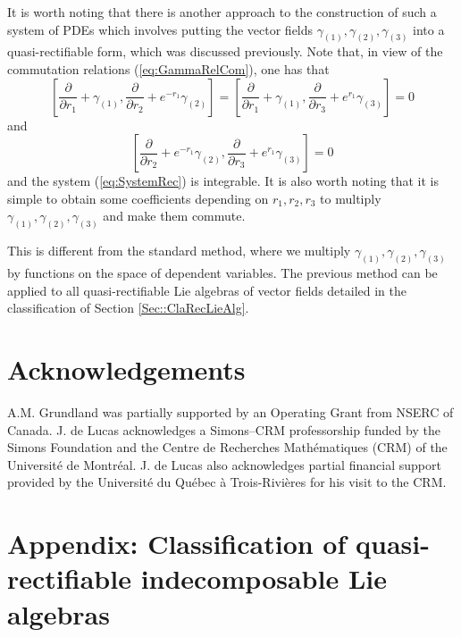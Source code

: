 \documentclass[12pt]{article}
\theoremstyle{plain}
\theoremstyle{definition}
\numberwithin{equation}{section}
\begin{document}
It is worth noting that there is another approach to the  construction of such a system of PDEs which involves putting the vector fields $\gamma_{(1)},\gamma_{(2)},\gamma_{(3)}$ into a quasi-rectifiable form, which was discussed previously. Note that, in view of the commutation relations (\ref{eq:GammaRelCom}), one has that
$$
\left[\frac{\partial}{\partial r_1}+\gamma_{(1)},\frac{\partial}{\partial r_2}+e^{-r_1}\gamma_{(2)}\right]\!=\!\left[\frac{\partial}{\partial r_1}+\gamma_{(1)},\frac{\partial}{\partial r_3}+e^{r_1}\gamma_{(3)}\right]\!=0
$$
and
$$
\!\left[\frac{\partial}{\partial r_2}+e^{-r_1}\gamma_{(2)},\frac{\partial}{\partial r_3}+e^{r_1}\gamma_{(3)}\right]=0
$$
and the system (\ref{eq:SystemRec}) is integrable. It is also worth noting that it is simple to obtain some coefficients depending on $r_1,r_2,r_3$ to multiply $\gamma_{(1)},\gamma_{(2)},\gamma_{(3)}$ and make them commute. 

This is different from the standard method, where we multiply $\gamma_{(1)},\gamma_{(2)},\gamma_{(3)}$ by functions on the space of dependent variables. The previous method can be applied to all quasi-rectifiable Lie algebras of vector fields detailed in the classification of Section \ref{Sec::ClaRecLieAlg}. 


\section*{Acknowledgements}

A.M. Grundland was partially supported by an Operating Grant from NSERC of Canada.  J. de Lucas acknowledges a Simons--CRM professorship funded by the Simons Foundation and the Centre de Recherches Math\'ematiques (CRM) of the Universit\'e de Montr\'eal. J. de Lucas also acknowledges partial financial support provided by the Universit\'e du Qu\'ebec \`a Trois-Rivi\`eres for his visit to the CRM. 

\newpage
\section{Appendix: Classification of quasi-rectifiable indecomposable Lie algebras}
\end{document}
